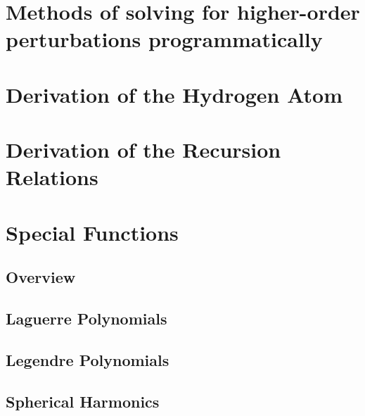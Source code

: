 \chapter{Methods of solving for higher-order perturbations programmatically}
\chapter{Derivation of the Hydrogen Atom}
\chapter{Derivation of the Recursion Relations}
\chapter{Special Functions}
    \section{Overview}
    \section{Laguerre Polynomials}
    \section{Legendre Polynomials}
    \section{Spherical Harmonics}